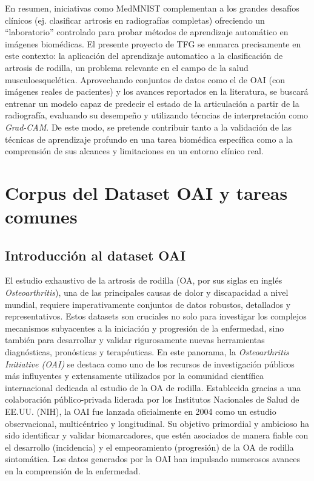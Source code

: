 \documentclass[11pt,spanish,listoffigures,listoftables]{tfgetsinf}
\begin{document}
En resumen, iniciativas como MedMNIST complementan a los grandes desafíos clínicos (ej. clasificar artrosis en radiografías 
completas) ofreciendo un “laboratorio” controlado para probar métodos de aprendizaje automático en imágenes biomédicas. 
El presente proyecto de TFG se enmarca precisamente en este contexto: la aplicación del aprendizaje automatico 
a la clasificación de artrosis de rodilla, un problema relevante en el campo de la salud musculoesquelética. 
Aprovechando conjuntos de datos como el de OAI \cite{chen2018knee} (con imágenes reales de pacientes) y los avances reportados 
en la literatura, se buscará entrenar un modelo capaz de predecir el estado de la articulación a partir de la radiografía, evaluando su desempeño 
y utilizando técncias de interpretación como \textit{Grad-CAM}. De este modo, se pretende contribuir tanto a la validación de las 
técnicas de aprendizaje profundo en una tarea biomédica específica como a la comprensión de sus alcances y limitaciones en 
un entorno clínico real.




\chapter{Corpus del Dataset OAI y tareas comunes}
\label{chap:corpus}

\section{Introducción al dataset OAI}

El estudio exhaustivo de la artrosis de rodilla (OA, por sus siglas en inglés \textit{Osteoarthritis}), una de las principales causas de dolor y discapacidad a nivel mundial, 
requiere imperativamente conjuntos de datos robustos, detallados y representativos. Estos datasets son cruciales no solo para investigar los complejos mecanismos subyacentes 
a la iniciación y progresión de la enfermedad, sino también para desarrollar y validar rigurosamente nuevas herramientas diagnósticas, pronósticas y terapéuticas. En este 
panorama, la \textit{Osteoarthritis Initiative (OAI)} \cite{niamsOAI} se destaca como uno de los recursos de investigación públicos más influyentes y extensamente utilizados 
por la comunidad científica internacional dedicada al estudio de la OA de rodilla. Establecida gracias a una colaboración público-privada liderada por los Institutos Nacionales 
de Salud de EE.UU. (NIH), la OAI fue lanzada oficialmente en 2004 como un estudio observacional, multicéntrico y longitudinal. Su objetivo primordial y ambicioso ha sido 
identificar y validar biomarcadores, que estén asociados de manera fiable con el desarrollo (incidencia) y el empeoramiento (progresión) de la OA de rodilla sintomática. 
Los datos generados por la OAI han impulsado numerosos avances en la comprensión de la enfermedad.
\end{document}
